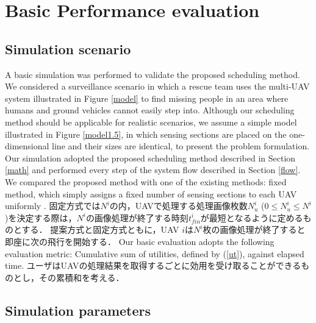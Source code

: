 \documentclass{ieeeaccess}
\begin{document}
\section{Basic Performance evaluation}\label{eva}

\subsection{Simulation scenario}
A basic simulation was performed to validate the proposed scheduling method.
%
We considered a surveillance scenario in which a rescue team uses the multi-UAV system illustrated in Figure \ref{model} to find missing people in an area where humans and ground vehicles cannot easily step into.
%
Although our scheduling method should be applicable for realistic scenarios, we assume a simple model illustrated in Figure \ref{model1.5}, in which sensing sections are placed on the one-dimensional line and their sizes are identical, to present the problem formulation.
%
Our simulation adopted the proposed scheduling method described in Section \ref{math} and performed every step of the system flow described in Section \ref{flow}.
%
We compared the proposed method with one of the existing methods: fixed method, which simply assigns a fixed number of sensing sections to each UAV uniformly \cite{chang2016}.
%
固定方式では$N^i$の内，UAVで処理する処理画像枚数$N_u^i$ ($0\leq{N_u^i}\leq{N^i}$)を決定する際は，$N^i$の画像処理が終了する時刻$t_{fin}^i$が最短となるように定めるものとする．
提案方式と固定方式ともに，UAV $i$は$N^i$枚の画像処理が終了すると即座に次の飛行を開始する．
%
Our basic evaluation adopts the following evaluation metric: Cumulative sum of utilities, defined by (\ref{ut}), against elapsed time.
ユーザはUAVの処理結果を取得するごとに効用を受け取ることができるものとし，その累積和を考える．

\subsection{Simulation parameters}
\end{document}
